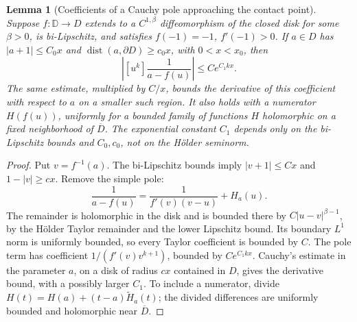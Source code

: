 \documentclass[11pt]{article}
\newtheorem{lemma}[proposition]{Lemma}
\begin{document}
\begin{lemma}[Coefficients of a Cauchy pole approaching the contact point]
\label{lem:moving-cauchy-coefficients}
Suppose $f:\mathbb D\to D$ extends to a $C^{1,\beta}$
diffeomorphism of the closed disk for some $\beta>0$, is bi-Lipschitz,
and satisfies $f(-1)=-1$, $f'(-1)>0$.
If $a\in D$ has $|a+1|\le C_0x$ and
$\operatorname{dist}(a,\partial D)\ge c_0x$, with $0<x<x_0$,
then
\[
 \left|[u^k]\frac1{a-f(u)}\right|\le C e^{C_1kx}.
\]
The same estimate, multiplied by $C/x$, bounds the derivative of
this coefficient with respect to $a$ on a smaller such region.
It also holds with a numerator $H(f(u))$, uniformly for a bounded
family of functions $H$ holomorphic on a fixed neighborhood of
$\overline D$. The exponential constant $C_1$ depends only on the
bi-Lipschitz bounds and $C_0,c_0$, not on the H\"older seminorm.
\end{lemma}
\begin{proof}
Put $v=f^{-1}(a)$. The bi-Lipschitz bounds imply
$|v+1|\le Cx$ and $1-|v|\ge cx$.
Remove the simple pole:
\[
 \frac1{a-f(u)}=\frac1{f'(v)(v-u)}+H_a(u).
\]
The remainder is holomorphic in the disk and is bounded there by
$C|u-v|^{\beta-1}$, by the H\"older Taylor remainder and the lower
Lipschitz bound. Its boundary $L^1$ norm is uniformly bounded,
so every Taylor coefficient is bounded by $C$. The pole term has
coefficient $1/(f'(v)v^{k+1})$, bounded by $Ce^{C_1kx}$.
Cauchy's estimate in the parameter $a$, on a disk of radius $cx$
contained in $D$, gives the derivative bound, with a possibly larger
$C_1$. To include a numerator, divide
$H(t)=H(a)+(t-a)\widetilde H_a(t)$; the divided differences are
uniformly bounded and holomorphic near $\overline D$.
\end{proof}
\end{document}
